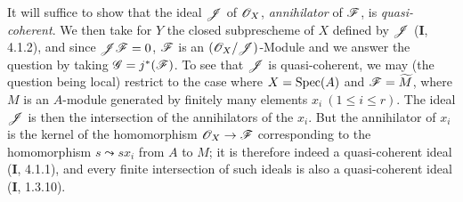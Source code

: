 It will suffice to show that the ideal $\mathscr{J}$ of $\mathscr{O}_X$,
\emph{annihilator} of $\mathscr{F}$, is \emph{quasi-coherent}. We then take for $Y$
the closed subprescheme of $X$ defined by $\mathscr{J}$ (\textbf{I}, 4.1.2), and since
$\mathscr{J}\mathscr{F}=0$, $\mathscr{F}$ is an $(\mathscr{O}_X/\mathscr{J})$-Module and we answer the
question by taking $\mathscr{G}=j^*(\mathscr{F})$. To see that $\mathscr{J}$ is
quasi-coherent, we may (the question being local) restrict to the case where
$X=\operatorname{Spec}(A)$ and $\mathscr{F}=\widetilde M$, where $M$ is an $A$-module generated
by finitely many elements $x_i\ (1\leq i\leq r)$. The ideal $\mathscr{J}$ is then
the intersection of the annihilators of the $x_i$. But the annihilator of
$x_i$ is the kernel of the homomorphism $\mathscr{O}_X\to\mathscr{F}$ corresponding to
the homomorphism $s\leadsto sx_i$ from $A$ to $M$; it is therefore indeed a
quasi-coherent ideal (\textbf{I}, 4.1.1), and every finite intersection of such ideals
is also a quasi-coherent ideal (\textbf{I}, 1.3.10).
